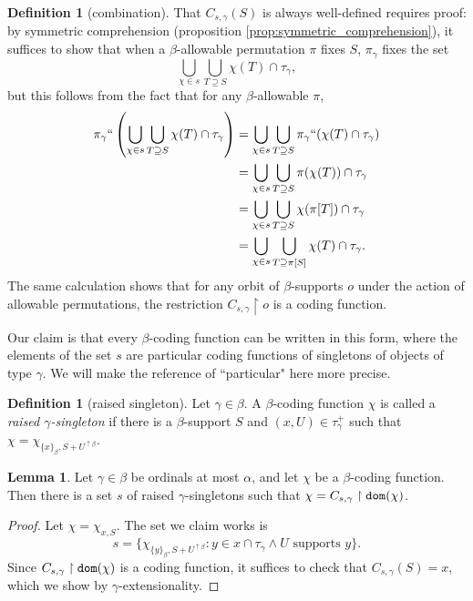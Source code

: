 \documentclass{article}
\theoremstyle{definition}
\newtheorem{lemma}[theorem]{Lemma}
\newtheorem{definition}[theorem]{Definition}
\theoremstyle{remark}
\begin{document}
{\begin{definition}[combination]
That $C_{s,\gamma}(S)$ is always well-defined requires proof: by symmetric comprehension (proposition \ref{prop:symmetric_comprehension}), it suffices to show that when a $\beta$-allowable permutation $\pi$ fixes $S$, $\pi_\gamma$ fixes the set
$$ \bigcup_{\chi \in s} \bigcup_{T \supseteq S} \chi(T) \cap \tau_\gamma, $$
but this follows from the fact that for any $\beta$-allowable $\pi$,
\begin{align*}
  \pi_\gamma``\left(\bigcup_{\chi \in s} \bigcup_{T \supseteq S} \chi(T) \cap \tau_\gamma\right)
  &= \bigcup_{\chi \in s} \bigcup_{T \supseteq S} \pi_\gamma``(\chi(T) \cap \tau_\gamma) \\
  &= \bigcup_{\chi \in s} \bigcup_{T \supseteq S} \pi(\chi(T)) \cap \tau_\gamma \\
  &= \bigcup_{\chi \in s} \bigcup_{T \supseteq S} \chi(\pi[T]) \cap \tau_\gamma \\
  &= \bigcup_{\chi \in s} \bigcup_{T \supseteq \pi[S]} \chi(T) \cap \tau_\gamma.
\end{align*}
The same calculation shows that for any orbit of $\beta$-supports $o$ under the action of allowable permutations, the restriction $C_{s,\gamma} \restriction o$ is a coding function.
\end{definition}

Our claim is that every $\beta$-coding function can be written in this form, where the elements of the set $s$ are particular coding functions of singletons of objects of type $\gamma$.  We will make the reference of ``particular" here more precise.

\begin{definition}[raised singleton]\label{def:raised_singleton}
  Let $\gamma \in \beta$.
  A $\beta$-coding function $\chi$ is called a {\em raised $\gamma$-singleton\/} if there is a $\beta$-support $S$ and $(x,U) \in \tau_{\gamma}^+$ such that $\chi = \chi_{\{x\}_\beta,S + U^{\uparrow \beta}}$.
\end{definition}
\begin{lemma}\label{lem:eq_combine}
  Let $\gamma \in \beta$ be ordinals at most $\alpha$, and let $\chi$ be a $\beta$-coding function.
  Then there is a set $s$ of raised $\gamma$-singletons such that $\chi = C_{s,\gamma} \restriction {\tt dom}(\chi)$.
\end{lemma}
\begin{proof}
  Let $\chi = \chi_{x,S}$.
  The set we claim works is
  $$ s = \{ \chi_{\{y\}_\beta,S + U^{\uparrow \beta}} : y \in x \cap \tau_\gamma \wedge U \text{ supports } y \}. $$
  Since $C_{s,\gamma} \restriction {\tt dom}(\chi)$ is a coding function, it suffices to check that $C_{s,\gamma}(S) = x$, which we show by $\gamma$-extensionality.


\end{proof}}
\end{document}
